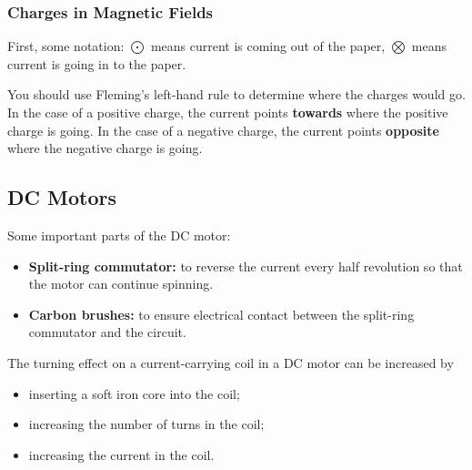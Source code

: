 \documentclass[../main.tex]{subfiles}
\begin{document}
	\subsubsection{Charges in Magnetic Fields}
	First, some notation: \(\bigodot\) means current is coming out of the paper, \(\bigotimes\) means current is going in to the paper.
	
	You should use Fleming's left-hand rule to determine where the charges would go. In the case of a positive charge, the current points \textbf{towards} where the positive charge is going. In the case of a negative charge, the current points \textbf{opposite} where the negative charge is going.
	
	\subsection{DC Motors}
	Some important parts of the DC motor:
	\begin{itemize}
		\item \textbf{Split-ring commutator:} to reverse the current every half revolution so that the motor can continue spinning.
		\item \textbf{Carbon brushes:} to ensure electrical contact between the split-ring commutator and the circuit.
	\end{itemize}

	The turning effect on a current-carrying coil in a DC motor can be increased by
	\begin{itemize}
		\item inserting a soft iron core into the coil;
		\item increasing the number of turns in the coil;
		\item increasing the current in the coil.
	\end{itemize}
\end{document}
